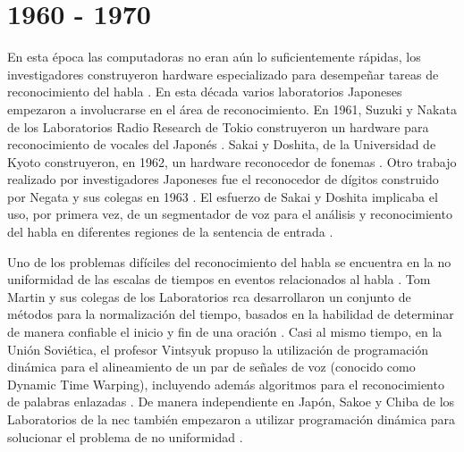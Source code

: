 \section{1960 - 1970}
\label{sec:60s}

En esta \'{e}poca las computadoras no eran a\'un lo suficientemente r\'{a}pidas, los investigadores
construyeron hardware especializado para desempe\~{n}ar tareas de reconocimiento del habla \cite{Furui50Years2004}.
En esta d\'{e}cada varios laboratorios Japoneses empezaron a involucrarse en el \'{a}rea de reconocimiento. En 1961,
Suzuki y Nakata de los Laboratorios Radio Research de Tokio construyeron un hardware para reconocimiento de vocales
del Japon\'{e}s \cite{SuzukiRecognition1961}. Sakai y Doshita, de la Universidad de Kyoto construyeron, en 1962, un
hardware reconocedor de fonemas \cite{SakaiThePhonetic1962}. Otro trabajo realizado por investigadores Japoneses fue
el reconocedor de d\'{i}gitos construido por Negata y sus colegas en 1963 \cite{NagataSpoken1963}. El esfuerzo de
Sakai y Doshita implicaba el uso, por primera vez, de un segmentador de voz para el an\'{a}lisis y reconocimiento
del habla en diferentes regiones de la sentencia de entrada \cite{JaisalAReview2012}.

Uno de los problemas dif\'{i}ciles del reconocimiento del habla se encuentra en la no uniformidad de las escalas de
tiempos en eventos relacionados al habla \cite{Furui50Years2004}. Tom Martin y sus colegas de los 
Laboratorios \gls{rca} desarrollaron un conjunto de m\'{e}todos para la normalizaci\'{o}n del tiempo, 
basados en la habilidad de determinar de manera confiable el inicio y fin de una oraci\'{o}n \cite{MartinSpeech1964}.
Casi al mismo tiempo, en la Uni\'{o}n Sovi\'{e}tica, el profesor Vintsyuk propuso la utilizaci\'{o}n de
programaci\'{o}n din\'{a}mica para el alineamiento de un par de se\~{n}ales de voz 
(conocido como Dynamic Time Warping), incluyendo adem\'{a}s algoritmos para el reconocimiento de palabras 
enlazadas \cite{VintsyukSpeech1968}. De manera independiente en Jap\'{o}n, Sakoe y Chiba de los Laboratorios de la
\gls{nec} tambi\'{e}n empezaron a utilizar programaci\'{o}n din\'{a}mica para solucionar el problema de no uniformidad
\cite{SakoeDynamic1978}.
